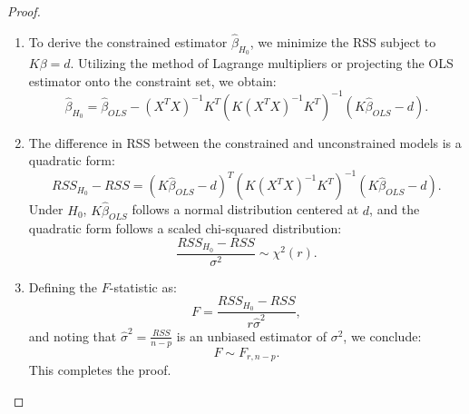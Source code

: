 \documentclass[open=any, 11pt,paper=A4]{scrreprt}
\begin{document}
\begin{proof}
\begin{enumerate}
    \item 
    To derive the constrained estimator \(\hat{\beta}_{H_0}\), we minimize the RSS subject to \(K\beta = d\). Utilizing the method of Lagrange multipliers or projecting the OLS estimator onto the constraint set, we obtain:
    \[
    \hat{\beta}_{H_0} = \hat{\beta}_{OLS} - (X^TX)^{-1} K^T (K (X^TX)^{-1} K^T)^{-1} (K \hat{\beta}_{OLS} - d).
    \]
    
    \item 
    The difference in RSS between the constrained and unconstrained models is a quadratic form:
    \[
    RSS_{H_0} - RSS = (K \hat{\beta}_{OLS} - d)^T (K (X^TX)^{-1} K^T)^{-1} (K \hat{\beta}_{OLS} - d).
    \]
    Under \(H_0\), \(K\hat{\beta}_{OLS}\) follows a normal distribution centered at \(d\), and the quadratic form follows a scaled chi-squared distribution:
    \[
    \frac{RSS_{H_0} - RSS}{\sigma^2} \sim \chi^2(r).
    \]
    
    \item 
    Defining the \(F\)-statistic as:
    \[
    F = \frac{RSS_{H_0} - RSS}{r \hat{\sigma}^2},
    \]
    and noting that \(\hat{\sigma}^2 = \frac{RSS}{n - p}\) is an unbiased estimator of \(\sigma^2\), we conclude:
    \[
    F \sim F_{r, n - p}.
    \]
    This completes the proof.
\end{enumerate}
\end{proof}




















\iffalse


\appendix


\end{document}

